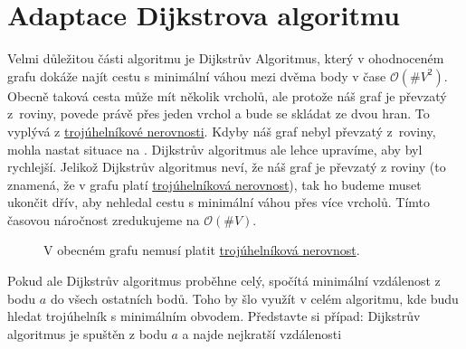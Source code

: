 \section{Adaptace Dijkstrova algoritmu}
\label{sec:dijkstra}

Velmi důležitou části algoritmu je Dijkstrův Algoritmus, který v ohodnoceném grafu dokáže najít cestu s minimální váhou mezi dvěma body v čase $ \mathcal{O}(\#V^2)$. \autocite{benlFormalCorrectnessProofs1999} Obecně taková cesta může mít několik vrcholů, ale protože náš graf je převzatý z~roviny, povede právě přes jeden vrchol a bude se skládat ze dvou hran. To vyplývá z \hyperref[definice:trojuhelnikova_nerovnost]{trojúhelníkové nerovnosti}. Kdyby náš graf nebyl převzatý z~roviny, mohla nastat situace na . Dijkstrův algoritmus ale lehce upravíme, aby byl rychlejší. Jelikož Dijkstrův algoritmus neví, že náš graf je převzatý z roviny (to znamená, že v grafu platí \hyperref[definice:trojuhelnikova_nerovnost]{trojúhelníková nerovnost}), tak ho budeme muset ukončit dřív, aby nehledal cestu s minimální váhou přes více vrcholů. Tímto časovou náročnost zredukujeme na $ \mathcal{O}(\#V)$.

\begin{figure}[H]
  \centering
  \caption{V obecném grafu nemusí platit \hyperref[definice:trojuhelnikova_nerovnost]{trojúhelníková nerovnost}.}
  \label{obr:troj_ner_graf}
\end{figure}
Pokud ale Dijkstrův algoritmus proběhne celý, spočítá minimální vzdálenost z bodu $a$ do všech ostatních bodů. Toho by šlo využít v celém algoritmu, kde budu hledat trojúhelník s minimálním obvodem. Představte si případ: Dijkstrův algoritmus je spuštěn z bodu $a$ a najde nejkratší vzdálenosti

